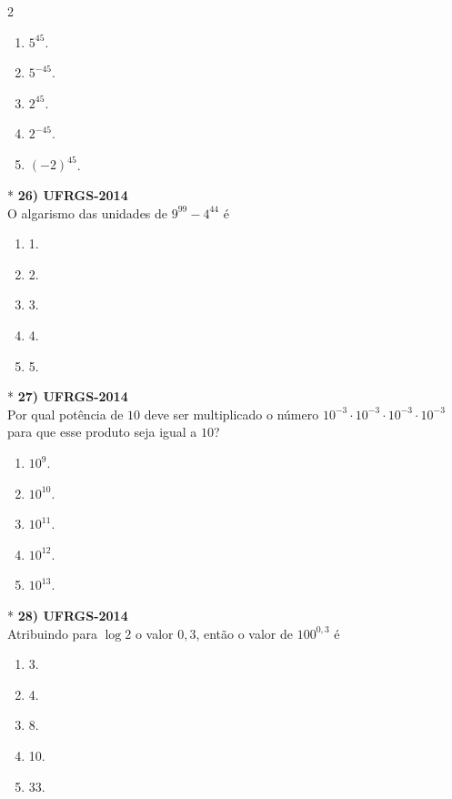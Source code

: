 \documentclass[11pt,a4paper]{article}
\begin{document}
\begin{paracol}{2}
\begin{enumerate}[label=(\Alph*)]
    \item $5^{45}$.
    \item $5^{-45}$.
    \item $2^{45}$.
    \item $2^{-45}$.
    \item $(-2)^{45}$.
\end{enumerate}
\vspace{0.4cm}

\switchcolumn[1]
\vspace{6cm}

\switchcolumn[0]*
\textbf{26) UFRGS-2014} \\
O algarismo das unidades de $9^{99} - 4^{44}$ é

\begin{enumerate}[label=(\Alph*)]
    \item 1.
    \item 2.
    \item 3.
    \item 4.
    \item 5.
\end{enumerate}
\vspace{0.4cm}

\switchcolumn[1]
\vspace{6cm}

\switchcolumn[0]*
\textbf{27) UFRGS-2014} \\
Por qual potência de $10$ deve ser multiplicado o número $10^{-3} \cdot 10^{-3} \cdot 10^{-3} \cdot 10^{-3}$ para que esse produto seja igual a $10$?

\begin{enumerate}[label=(\Alph*)]
    \item $10^9$.
    \item $10^{10}$.
    \item $10^{11}$.
    \item $10^{12}$.
    \item $10^{13}$.
\end{enumerate}
\vspace{0.4cm}

\switchcolumn[1]
\vspace{6cm}

\switchcolumn[0]*
\textbf{28) UFRGS-2014} \\
Atribuindo para $\log 2$ o valor $0{,}3$, então o valor de $100^{0{,}3}$ é

\begin{enumerate}[label=(\Alph*)]
    \item 3.
    \item 4.
    \item 8.
    \item 10.
    \item 33.
\end{enumerate}
\vspace{0.4cm}


\end{paracol}
\end{document}

